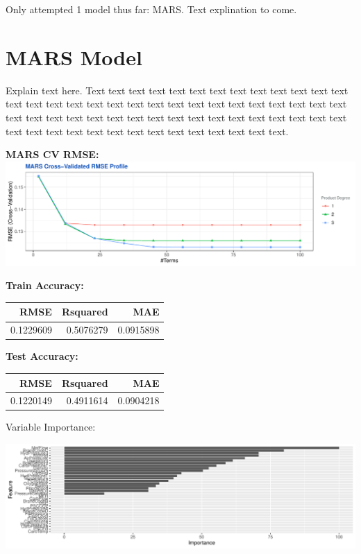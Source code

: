 \documentclass[]{report}
\begin{document}
Only attempted 1 model thus far: MARS. Text explination to come.

\hypertarget{mars-model}{%
\section{MARS Model}\label{mars-model}}

Explain text here. Text text text text text text text text text text
text text text text text text text text text text text text text text
text text text text text text text text text text text text text text
text text text text text text text text text text text text text text
text text text text text text text text text.

\textbf{MARS CV RMSE:}
\includegraphics{Proj2-JM_files/figure-latex/unnamed-chunk-7-1.pdf}

\textbf{Train Accuracy: }

\begin{table}[H]
\centering\begingroup\fontsize{8}{10}\selectfont

\begin{tabular}{r|r|r}
\hline
RMSE & Rsquared & MAE\\
\hline
\rowcolor{gray!6}  0.1229609 & 0.5076279 & 0.0915898\\
\hline
\end{tabular}
\endgroup{}
\end{table}

\textbf{Test Accuracy:}

\begin{table}[H]
\centering\begingroup\fontsize{8}{10}\selectfont

\begin{tabular}{r|r|r}
\hline
RMSE & Rsquared & MAE\\
\hline
\rowcolor{gray!6}  0.1220149 & 0.4911614 & 0.0904218\\
\hline
\end{tabular}
\endgroup{}
\end{table}

Variable Importance:

\includegraphics{Proj2-JM_files/figure-latex/unnamed-chunk-10-1.pdf}
\end{document}
